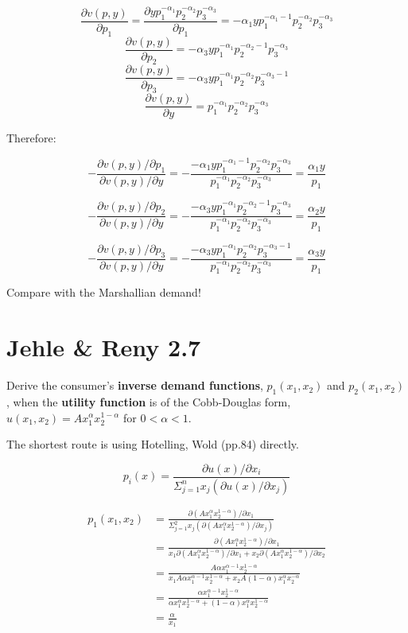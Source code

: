 \documentclass{article}
\begin{document}
$$\frac{\partial v(p,y)} {\partial p_1} = \frac{\partial yp_1^{-\alpha_1}p_2^{-\alpha_2}p_3^{-\alpha_3}}{\partial p_1} =  -\alpha_1 yp_1^{-\alpha_1 -1}p_2^{-\alpha_2}p_3^{-\alpha_3}$$
$$\frac{\partial v(p,y)} {\partial p_2} =  -\alpha_3 yp_1^{-\alpha_1}p_2^{-\alpha_2-1}p_3^{-\alpha_3}$$
$$\frac{\partial v(p,y)} {\partial p_3} =  -\alpha_3 yp_1^{-\alpha_1}p_2^{-\alpha_2}p_3^{-\alpha_3-1}$$
$$\frac{\partial v(p,y)} {\partial y} = p_1^{-\alpha_1}p_2^{-\alpha_2}p_3^{-\alpha_3}$$

Therefore:

$$-\frac{\partial v(p,y) / \partial p_1}{\partial v(p,y) / \partial y} =-\frac{-\alpha_1 yp_1^{-\alpha_1 -1}p_2^{-\alpha_2}p_3^{-\alpha_3}}{p_1^{-\alpha_1}p_2^{-\alpha_2}p_3^{-\alpha_3}} = \frac{\alpha_1 y}{p_1}$$

$$-\frac{\partial v(p,y) / \partial p_2}{\partial v(p,y) / \partial y} =-\frac{-\alpha_3 yp_1^{-\alpha_1}p_2^{-\alpha_2-1}p_3^{-\alpha_3}}{p_1^{-\alpha_1}p_2^{-\alpha_2}p_3^{-\alpha_3}} = \frac{\alpha_2 y}{p_1}$$

$$-\frac{\partial v(p,y) / \partial p_3}{\partial v(p,y) / \partial y} =-\frac{ -\alpha_3 yp_1^{-\alpha_1}p_2^{-\alpha_2}p_3^{-\alpha_3-1}}{p_1^{-\alpha_1}p_2^{-\alpha_2}p_3^{-\alpha_3}} = \frac{\alpha_3 y}{p_1}$$

Compare with the Marshallian demand!

\section{Jehle \& Reny 2.7}
Derive the consumer's \textbf{inverse demand functions}, $p_1(x_1, x_2)$ and $p_2(x_1, x_2)$, when the \textbf{utility function} is of the Cobb-Douglas form, $u(x_1, x_2) = Ax_1^{\alpha}x_2^{1-\alpha}$ for $0 < \alpha < 1$.

\begin{mdframed}[backgroundcolor=blue!20,linecolor=white]
The shortest route is using Hotelling, Wold (pp.84) directly.

$$p_i(x) = \frac{\partial u(x) / \partial x_i}{\Sigma^{n}_{j=1} x_j( \partial u(x) / \partial x_j)}$$
\end{mdframed}

\begin{align*}
p_1(x_1,x_2) &=  \frac{\partial (Ax_1^{\alpha}x_2^{1-\alpha}) / \partial x_1}{\Sigma^{2}_{j=1} x_j( \partial (Ax_1^{\alpha}x_2^{1-\alpha}) / \partial x_j)} \\
&=\frac{\partial (Ax_1^{\alpha}x_2^{1-\alpha}) / \partial x_1}{x_1 \partial (Ax_1^{\alpha}x_2^{1-\alpha}) / \partial x_1 + x_2  \partial (Ax_1^{\alpha}x_2^{1-\alpha}) / \partial x_2} \\
&=\frac{A\alpha x_1^{\alpha -1}x_2^{1-\alpha}}{x_1 A\alpha x_1^{\alpha -1}x_2^{1-\alpha} + x_2A(1-\alpha) x_1^{\alpha}x_2^{-\alpha}} \\
&=\frac{\alpha x_1^{\alpha -1}x_2^{1-\alpha}}{\alpha x_1^{\alpha}x_2^{1-\alpha} + (1-\alpha) x_1^{\alpha}x_2^{1-\alpha}} \\
&=\frac{\alpha}{x_1}
\end{align*}
\end{document}

